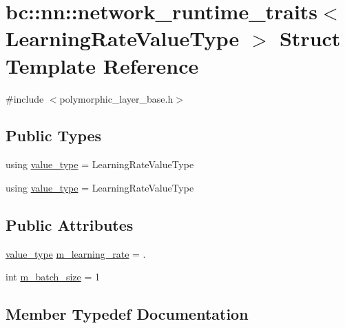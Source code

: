 \hypertarget{structbc_1_1nn_1_1network__runtime__traits}{}\section{bc\+:\+:nn\+:\+:network\+\_\+runtime\+\_\+traits$<$ Learning\+Rate\+Value\+Type $>$ Struct Template Reference}
\label{structbc_1_1nn_1_1network__runtime__traits}


{\ttfamily \#include $<$polymorphic\+\_\+layer\+\_\+base.\+h$>$}

\subsection*{Public Types}
\begin{DoxyCompactItemize}
\item 
using \hyperlink{structbc_1_1nn_1_1network__runtime__traits_a1321d62a8c691fc6e6d14c8f100d457b}{value\+\_\+type} = Learning\+Rate\+Value\+Type
\item 
using \hyperlink{structbc_1_1nn_1_1network__runtime__traits_a1321d62a8c691fc6e6d14c8f100d457b}{value\+\_\+type} = Learning\+Rate\+Value\+Type
\end{DoxyCompactItemize}
\subsection*{Public Attributes}
\begin{DoxyCompactItemize}
\item 
\hyperlink{structbc_1_1nn_1_1network__runtime__traits_a1321d62a8c691fc6e6d14c8f100d457b}{value\+\_\+type} \hyperlink{structbc_1_1nn_1_1network__runtime__traits_afee9be6763ad03156399d47ffeb363dc}{m\+\_\+learning\+\_\+rate} = .
\item 
int \hyperlink{structbc_1_1nn_1_1network__runtime__traits_a4ae9c3b085d55afab9695e73a7b62565}{m\+\_\+batch\+\_\+size} = 1
\end{DoxyCompactItemize}


\subsection{Member Typedef Documentation}
\mbox{\label{structbc_1_1nn_1_1network__runtime__traits_a1321d62a8c691fc6e6d14c8f100d457b}} 
